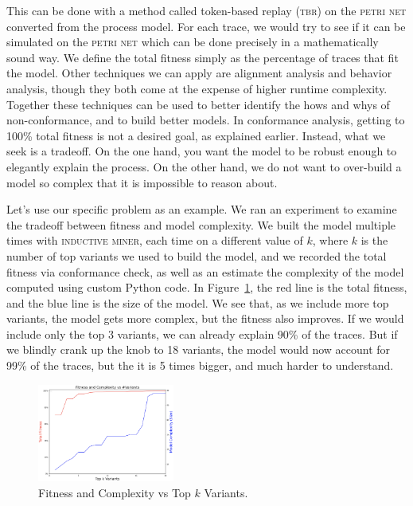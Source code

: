 \documentclass[conference]{IEEEtran}
\begin{document}
This can be done with a method called token-based replay (\textsc{tbr}) on the
\textsc{petri net} converted from the process model. For each trace, we would try
to see if it can be simulated on the \textsc{petri net} which can be done
precisely in a mathematically sound
way. We define the total fitness
simply as the percentage of traces that fit the model. Other techniques
we can apply are 
alignment analysis and behavior analysis, though
they both come at the expense of higher runtime complexity.
Together these techniques can be used to better identify the hows and whys of
non-conformance, and to build better models.
In conformance analysis,
getting to 100\% total fitness is not a desired goal, as explained earlier.
Instead, what we seek is a tradeoff. On the one hand, you want the model
to be robust enough to elegantly explain the process. On the other hand,
we do not want to over-build a model so complex that it is impossible to
reason about.

Let's use our specific problem as an example. We
ran an experiment to examine the tradeoff between fitness and model
complexity. We built the model multiple times with \textsc{inductive miner},
each time on a different value of $k$, where $k$ is the number of top
variants we
used to build the model, and we recorded the total fitness via conformance
check, as well as an estimate the complexity of the model computed using
custom Python code.
In Figure~\ref{fig-tradeoff}, the
red line is the total fitness, and the blue line is the size of the
model. We see that, as we include more top variants, the model gets more
complex, but the fitness also improves. If we would include only the top
3 variants, we can already explain 90\% of the traces. But if we blindly
crank up the knob to 
18 variants, the model would now account for 99\% of the traces, but the
it is 5 times bigger, and much harder to understand.

\begin{figure}[htbp]
\centerline{\includegraphics[width=0.40\textwidth]{images/tradeoff.png}}
\caption{Fitness and Complexity vs Top $k$ Variants.}
\label{fig-tradeoff}
\end{figure}
\end{document}
